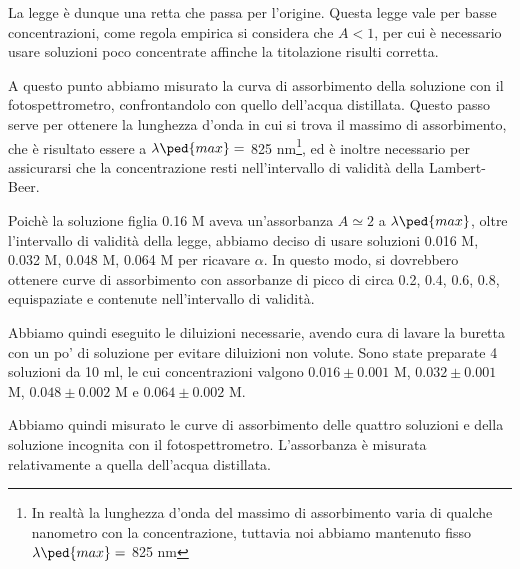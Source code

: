 La legge è dunque una retta che passa per l'origine. Questa legge vale per basse
concentrazioni, come regola empirica si considera che $A < 1$, per cui è necessario
usare soluzioni poco concentrate affinche la titolazione risulti corretta.

A questo punto abbiamo misurato la curva di assorbimento della soluzione con il
fotospettrometro, confrontandolo con quello dell'acqua distillata. Questo passo
serve per ottenere la lunghezza d'onda in cui si trova il massimo di assorbimento,
che è risultato essere a $\lambda\ped{max} =$ 825 nm\footnote{In realtà la lunghezza
d'onda del massimo di assorbimento varia di qualche nanometro con la concentrazione,
tuttavia noi abbiamo mantenuto fisso $\lambda\ped{max} =$ 825 nm}, ed è inoltre necessario per
assicurarsi che la concentrazione resti nell'intervallo di validità della Lambert-Beer.

Poichè la soluzione figlia 0.16 M aveva un'assorbanza $A \simeq 2$ a $\lambda\ped{max}$,
oltre l'intervallo di validità della legge, abbiamo deciso di usare soluzioni
0.016 M, 0.032 M, 0.048 M, 0.064 M per ricavare $\alpha$. In questo modo, si dovrebbero
ottenere curve di assorbimento con assorbanze di picco di circa 0.2, 0.4, 0.6, 0.8,
equispaziate e contenute nell'intervallo di validità.

Abbiamo quindi eseguito le diluizioni necessarie, avendo cura di lavare la buretta con
un po' di soluzione per evitare diluizioni non volute. Sono state preparate 4 soluzioni
da 10 ml, le cui concentrazioni valgono $0.016 \pm 0.001$ M, $0.032 \pm 0.001$ M,
$0.048 \pm 0.002$ M e $0.064 \pm 0.002$ M.

Abbiamo quindi misurato le curve di assorbimento delle quattro soluzioni e della
soluzione incognita con il fotospettrometro. L'assorbanza è misurata relativamente a quella
dell'acqua distillata.
